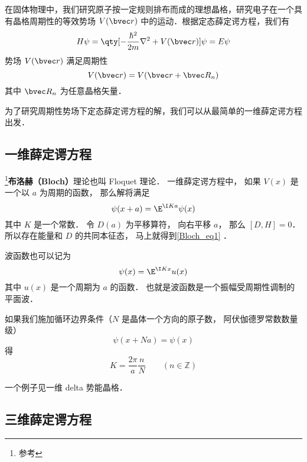 
\begin{issues}
\issueDraft
\end{issues}


在固体物理中，我们研究原子按一定规则排布而成的理想晶格，研究电子在一个具有晶格周期性的等效势场 $V(\bvec r)$ 中的运动．根据定态薛定谔方程，我们有
\begin{equation}
H\psi=\qty[-\frac{\hbar^2}{2m}\nabla^2+V(\bvec r)] \psi = E\psi
\end{equation}
势场 $V(\bvec r)$ 满足周期性
\begin{equation}
V(\bvec r)=V(\bvec r+\bvec R_n)
\end{equation}
其中 $\bvec R_n$ 为任意晶格矢量．

为了研究周期性势场下定态薛定谔方程的解，我们可以从最简单的一维薛定谔方程出发．

\subsection{一维薛定谔方程}
\footnote{参考\cite{GriffQ}}\textbf{布洛赫（Bloch）}理论也叫 Floquet 理论． 一维薛定谔方程中， 如果 $V(x)$ 是一个以 $a$ 为周期的函数， 那么解将满足
\begin{equation}\label{Bloch_eq1}
\psi(x+a) = \E^{\I K a}\psi(x)
\end{equation}
其中 $K$ 是一个常数． 令 $D(a)$ 为平移算符， 向右平移 $a$， 那么 $[D,H] = 0$． 所以存在能量和 $D$ 的共同本征态， 马上就得到\autoref{Bloch_eq1} ．

波函数也可以记为
\begin{equation}
\psi(x) = \E^{\I K x} u(x)
\end{equation}
其中 $u(x)$ 是一个周期为 $a$ 的函数． 也就是波函数是一个振幅受周期性调制的平面波．

如果我们施加循环边界条件（$N$ 是晶体一个方向的原子数， 阿伏伽德罗常数数量级）
\begin{equation}
\psi(x+Na) = \psi(x)
\end{equation}
得
\begin{equation}
K = \frac{2\pi}{a} \frac{n}{N} \qquad (n \in \mathbb Z)
\end{equation}

一个例子见一维 delta 势能晶格．

\subsection{三维薛定谔方程}

